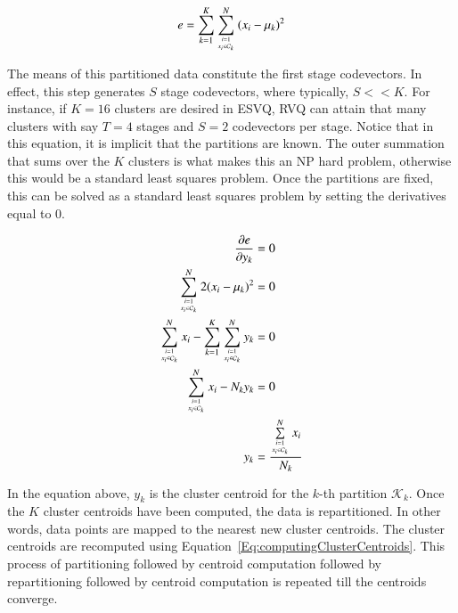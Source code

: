 \begin{Body}
\begin{enumerate}
\begin{enumerate}
\begin{equation}
\label{Eq:KmeansError}
e = \sum\limits_{k=1}^K \sum\limits_{{i=1 \atop x_i \in \mathcal{C}_k}}^N {(x_i - \mu_k)}^2
\end{equation}

The means of this partitioned data constitute the first stage codevectors.  In effect, this step generates $S$ stage codevectors, where typically, $S << K$.  For instance, if $K=16$ clusters are desired in ESVQ, RVQ can attain that many clusters with say $T=4$ stages and $S=2$ codevectors per stage.  Notice that in this equation, it is implicit that the partitions are known.  The outer summation that sums over the $K$ clusters is what makes this an NP hard problem, otherwise this would be a standard least squares problem.  Once the partitions are fixed, this can be solved as a standard least squares problem by setting the derivatives equal to 0.  

\begin{align}
\frac{\partial{e}}{\partial{y_k}} &= 0\notag\\
\sum\limits_{{i=1 \atop x_i \in \mathcal{C}_k}}^N 2 {(x_i - \mu_k)}^2 &= 0\notag\\
\sum\limits_{{i=1 \atop x_i \in \mathcal{C}_k}}^N x_i - \sum\limits_{k=1}^K \sum\limits_{{i=1 \atop x_i \in \mathcal{C}_k}}^N y_k &= 0\notag\\
\sum\limits_{{i=1 \atop x_i \in \mathcal{C}_k}}^N x_i - N_k y_k &= 0\notag\\
y_k &= \frac{\sum\limits_{{i=1 \atop x_i \in \mathcal{C}_k}}^N x_i}{N_k}
\label{Eq:computingClusterCentroids}
\end{align}

In the equation above, $y_k$ is the cluster centroid for the $k$-th partition $\mathcal{K}_k$.  Once the $K$ cluster centroids have been computed, the data is repartitioned.  In other words, data points are mapped to the nearest new cluster centroids.  The cluster centroids are recomputed using Equation~\ref{Eq:computingClusterCentroids}.  This process of partitioning followed by centroid computation followed by repartitioning followed by centroid computation is repeated till the centroids converge.


\end{enumerate}
\end{enumerate}
\end{Body}
